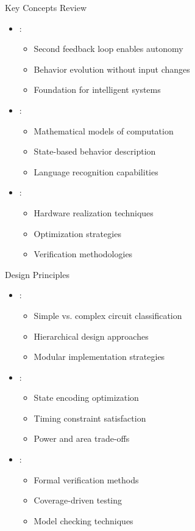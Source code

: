 \begin{frame}{Key Concepts Review}
\begin{itemize}
\item {}:
\begin{itemize}
\item Second feedback loop enables autonomy
\item Behavior evolution without input changes
\item Foundation for intelligent systems
\end{itemize}
\vspace{0.3cm}
\item {}:
\begin{itemize}
\item Mathematical models of computation
\item State-based behavior description
\item Language recognition capabilities
\end{itemize}
\vspace{0.3cm}
\item {}:
\begin{itemize}
\item Hardware realization techniques
\item Optimization strategies
\item Verification methodologies
\end{itemize}
\end{itemize}
\end{frame}

\begin{frame}{Design Principles}
\begin{itemize}
\item {}:
\begin{itemize}
\item Simple vs. complex circuit classification
\item Hierarchical design approaches
\item Modular implementation strategies
\end{itemize}
\vspace{0.3cm}
\item {}:
\begin{itemize}
\item State encoding optimization
\item Timing constraint satisfaction
\item Power and area trade-offs
\end{itemize}
\vspace{0.3cm}
\item {}:
\begin{itemize}
\item Formal verification methods
\item Coverage-driven testing
\item Model checking techniques
\end{itemize}
\end{itemize}
\end{frame}

